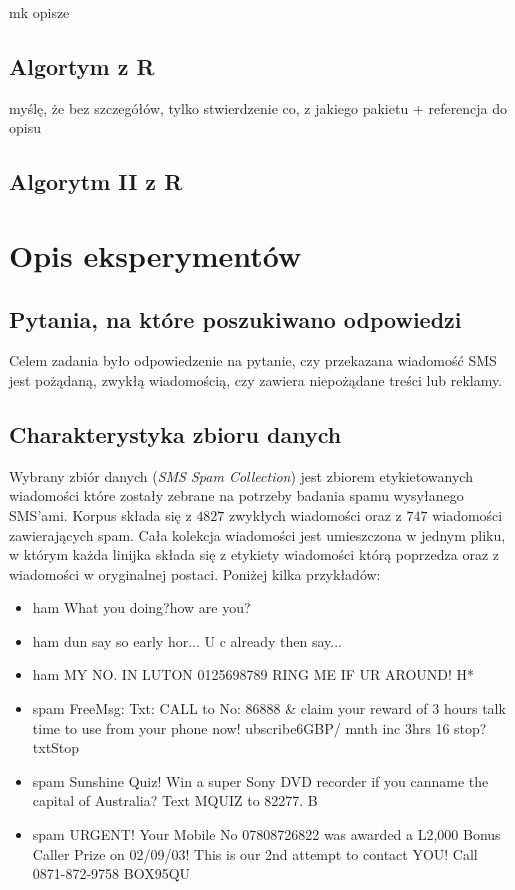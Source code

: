 \documentclass[a4paper,12pt]{article}
\begin{document}
mk opisze


\subsection{Algortym z R}

myślę, że bez szczegółów, tylko stwierdzenie co, z jakiego pakietu + referencja do opisu

\subsection{Algorytm II z R}

\section{Opis eksperymentów}

\subsection{Pytania, na które poszukiwano odpowiedzi}

Celem zadania było odpowiedzenie na pytanie, czy przekazana wiadomość SMS jest pożądaną, zwykłą wiadomością, czy zawiera niepożądane treści lub reklamy.

\subsection{Charakterystyka zbioru danych}\label{dane:charakterystyka}

Wybrany zbiór danych (\textit{SMS Spam Collection}) jest zbiorem etykietowanych wiadomości które zostały zebrane na potrzeby badania spamu wysyłanego SMS'ami. Korpus składa się z $4827$ zwykłych wiadomości oraz z $747$ wiadomości zawierających spam. Cała kolekcja wiadomości jest umieszczona w jednym pliku, w którym każda linijka składa się z etykiety wiadomości którą poprzedza oraz z wiadomości w oryginalnej postaci. Poniżej kilka przykładów:

\begin{itemize}
	\item ham What you doing?how are you? 
	\item ham dun say so early hor... U c already then say... 
	\item ham MY NO. IN LUTON 0125698789 RING ME IF UR AROUND! H* 
	\item spam FreeMsg: Txt: CALL to No: 86888 \& claim your reward of 3 hours talk time to use from your phone now! ubscribe6GBP/ mnth inc 3hrs 16 stop?txtStop 
	\item spam Sunshine Quiz! Win a super Sony DVD recorder if you canname the capital of Australia? Text MQUIZ to 82277. B 
	\item spam URGENT! Your Mobile No 07808726822 was awarded a L2,000 Bonus Caller Prize on 02/09/03! This is our 2nd attempt to contact YOU! Call 0871-872-9758 BOX95QU 
\end{itemize}
\end{document}
